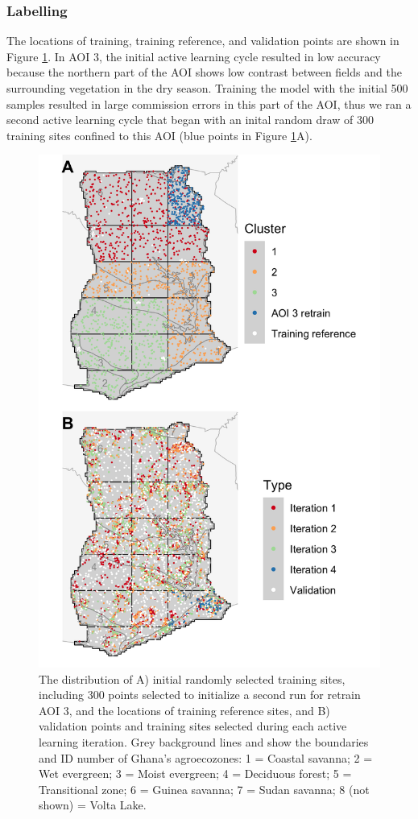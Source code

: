 \documentclass[
  11pt,
  a4paper]{article}
\begin{document}
\hypertarget{labelling}{%
\subsubsection{Labelling}\label{labelling}}

The locations of training, training reference, and validation points are
shown in Figure \ref{fig:trainval}. In AOI 3, the initial active
learning cycle resulted in low accuracy because the northern part of the
AOI shows low contrast between fields and the surrounding vegetation in
the dry season. Training the model with the initial 500 samples resulted
in large commission errors in this part of the AOI, thus we ran a second
active learning cycle that began with an inital random draw of 300
training sites confined to this AOI (blue points in Figure
\ref{fig:trainval}A).

\begin{figure}[!ht]

{\centering \includegraphics[width=0.7\linewidth,]{figures/si_training_validation_pts} 

}

\caption{The distribution of A) initial randomly selected training sites, including 300 points selected to initialize a second run for retrain AOI 3, and the locations of training reference sites, and B) validation points and training sites selected during each active learning iteration. Grey background lines and show the boundaries and ID number of Ghana's agroecozones: 1 = Coastal savanna; 2 = Wet evergreen; 3 = Moist evergreen; 4 = Deciduous forest; 5 = Transitional zone; 6 = Guinea savanna; 7 = Sudan savanna; 8 (not shown) = Volta Lake.}\label{fig:trainval}
\end{figure}
\end{document}
